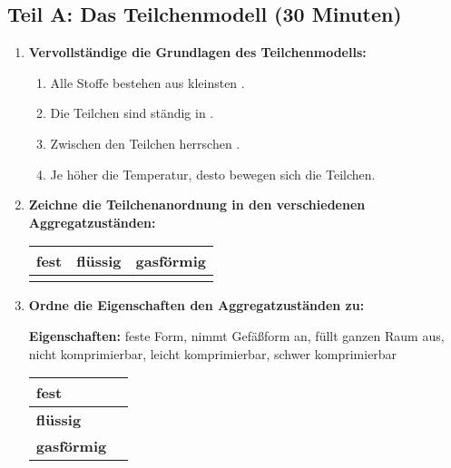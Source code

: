 \subsection*{Teil A: Das Teilchenmodell (30 Minuten)}

\begin{enumerate}[label=\arabic*.]
    \item \textbf{Vervollständige die Grundlagen des Teilchenmodells:}
    \vspace{0.5cm}

    \begin{enumerate}[label=\alph*)]
        \item Alle Stoffe bestehen aus kleinsten \underline{\hspace{4cm}}.
        \item Die Teilchen sind ständig in \underline{\hspace{4cm}}.
        \item Zwischen den Teilchen herrschen \underline{\hspace{4cm}}.
        \item Je höher die Temperatur, desto \underline{\hspace{4cm}} bewegen sich die Teilchen.
    \end{enumerate}

    \vspace{1cm}

    \item \textbf{Zeichne die Teilchenanordnung in den verschiedenen Aggregatzuständen:}
    \vspace{0.5cm}

    \begin{tabular}{|p{4cm}|p{4cm}|p{4cm}|}
        \hline
        \textbf{fest} & \textbf{flüssig} & \textbf{gasförmig} \\
        \hline
        & & \\[3cm]
        \hline
    \end{tabular}

    \vspace{1cm}

    \item \textbf{Ordne die Eigenschaften den Aggregatzuständen zu:}
    \vspace{0.5cm}

    \textbf{Eigenschaften:} feste Form, nimmt Gefäßform an, füllt ganzen Raum aus, nicht komprimierbar, leicht komprimierbar, schwer komprimierbar

    \begin{tabular}{|p{4cm}|p{10cm}|}
        \hline
        \textbf{fest} & \\[1cm]
        \hline
        \textbf{flüssig} & \\[1cm]
        \hline
        \textbf{gasförmig} & \\[1cm]
        \hline
    \end{tabular}

\end{enumerate}